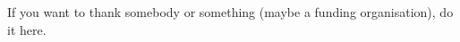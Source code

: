 \documentclass[12pt]{article}
\begin{document}
If you want to thank somebody or something (maybe a funding organisation), do it here.

%
%
%
%


%
%
%
%
%
\appendix
\end{document}
